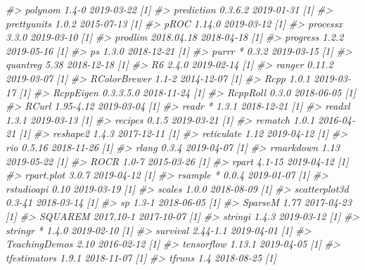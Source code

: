 \documentclass[]{krantz}
\makeatletter
\newenvironment{Shaded}{\begin{snugshade}}{\end{snugshade}}
\newcommand{\CommentTok}[1]{\textcolor[rgb]{0.37,0.37,0.37}{\textit{#1}}}
\newenvironment{kframe}{%
\medskip{}
\setlength{\fboxsep}{.8em}
 \def\at@end@of@kframe{}%
 \ifinner\ifhmode%
  \def\at@end@of@kframe{\end{minipage}}%
  \begin{minipage}{\columnwidth}%
 \fi\fi%
 \def\FrameCommand##1{\hskip\@totalleftmargin \hskip-\fboxsep
 \colorbox{shadecolor}{##1}\hskip-\fboxsep
     \hskip-\linewidth \hskip-\@totalleftmargin \hskip\columnwidth}%
 \MakeFramed {\advance\hsize-\width
   \@totalleftmargin\z@ \linewidth\hsize
   \@setminipage}}%
 {\par\unskip\endMakeFramed%
 \at@end@of@kframe}
\renewenvironment{Shaded}{\begin{kframe}}{\end{kframe}}
\makeatother
\begin{document}
\begin{Shaded}
\begin{Highlighting}[]
\CommentTok{#>    polynom         1.4-0      2019-03-22 [1]}
\CommentTok{#>    prediction      0.3.6.2    2019-01-31 [1]}
\CommentTok{#>    prettyunits     1.0.2      2015-07-13 [1]}
\CommentTok{#>    pROC            1.14.0     2019-03-12 [1]}
\CommentTok{#>    processx        3.3.0      2019-03-10 [1]}
\CommentTok{#>    prodlim         2018.04.18 2018-04-18 [1]}
\CommentTok{#>    progress        1.2.2      2019-05-16 [1]}
\CommentTok{#>    ps              1.3.0      2018-12-21 [1]}
\CommentTok{#>    purrr         * 0.3.2      2019-03-15 [1]}
\CommentTok{#>    quantreg        5.38       2018-12-18 [1]}
\CommentTok{#>    R6              2.4.0      2019-02-14 [1]}
\CommentTok{#>    ranger          0.11.2     2019-03-07 [1]}
\CommentTok{#>    RColorBrewer    1.1-2      2014-12-07 [1]}
\CommentTok{#>    Rcpp            1.0.1      2019-03-17 [1]}
\CommentTok{#>    RcppEigen       0.3.3.5.0  2018-11-24 [1]}
\CommentTok{#>    RcppRoll        0.3.0      2018-06-05 [1]}
\CommentTok{#>    RCurl           1.95-4.12  2019-03-04 [1]}
\CommentTok{#>    readr         * 1.3.1      2018-12-21 [1]}
\CommentTok{#>    readxl          1.3.1      2019-03-13 [1]}
\CommentTok{#>    recipes         0.1.5      2019-03-21 [1]}
\CommentTok{#>    rematch         1.0.1      2016-04-21 [1]}
\CommentTok{#>    reshape2        1.4.3      2017-12-11 [1]}
\CommentTok{#>    reticulate      1.12       2019-04-12 [1]}
\CommentTok{#>    rio             0.5.16     2018-11-26 [1]}
\CommentTok{#>    rlang           0.3.4      2019-04-07 [1]}
\CommentTok{#>    rmarkdown       1.13       2019-05-22 [1]}
\CommentTok{#>    ROCR            1.0-7      2015-03-26 [1]}
\CommentTok{#>    rpart           4.1-15     2019-04-12 [1]}
\CommentTok{#>    rpart.plot      3.0.7      2019-04-12 [1]}
\CommentTok{#>    rsample       * 0.0.4      2019-01-07 [1]}
\CommentTok{#>    rstudioapi      0.10       2019-03-19 [1]}
\CommentTok{#>    scales          1.0.0      2018-08-09 [1]}
\CommentTok{#>    scatterplot3d   0.3-41     2018-03-14 [1]}
\CommentTok{#>    sp              1.3-1      2018-06-05 [1]}
\CommentTok{#>    SparseM         1.77       2017-04-23 [1]}
\CommentTok{#>    SQUAREM         2017.10-1  2017-10-07 [1]}
\CommentTok{#>    stringi         1.4.3      2019-03-12 [1]}
\CommentTok{#>    stringr       * 1.4.0      2019-02-10 [1]}
\CommentTok{#>    survival        2.44-1.1   2019-04-01 [1]}
\CommentTok{#>    TeachingDemos   2.10       2016-02-12 [1]}
\CommentTok{#>    tensorflow      1.13.1     2019-04-05 [1]}
\CommentTok{#>    tfestimators    1.9.1      2018-11-07 [1]}
\CommentTok{#>    tfruns          1.4        2018-08-25 [1]}

\end{Highlighting}
\end{Shaded}
\end{document}
